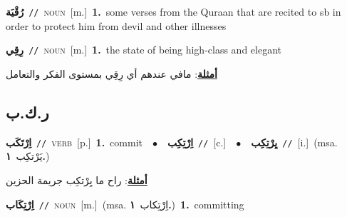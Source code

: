 \documentclass[10pt,a4paper,twoside]{article} %
\begin{document}
\begin{multicols}{2}
{\setlength\topsep{0pt}\textbf{\foreignlanguage{arabic}{رُقْيَة}}\ {\color{gray}\texttt{//}\color{black}}\ \textsc{noun}\ [m.]\ \textbf{1.}~some verses from the Quraan that are recited to sb in order to protect him from devil and other illnesses\ } \vspace{2mm}

{\setlength\topsep{0pt}\textbf{\foreignlanguage{arabic}{رِقِي}}\ {\color{gray}\texttt{//}\color{black}}\ \textsc{noun}\ [m.]\ \textbf{1.}~the state of being high-class and elegant\  \begin{flushright}\color{gray}\foreignlanguage{arabic}{\textbf{\underline{\foreignlanguage{arabic}{أمثلة}}}: مافي عندهم أي رِقِي بمستوى الفكر والتعامل}\end{flushright}\color{black}} \vspace{2mm}

\vspace{-3mm}
\subsection*{\color{blue}\foreignlanguage{arabic}{ر.ك.ب}\color{blue}{}} 

{\setlength\topsep{0pt}\textbf{\foreignlanguage{arabic}{اِرْتَكَب}}\ {\color{gray}\texttt{//}\color{black}}\ \textsc{verb}\ [p.]\ \textbf{1.}~commit\ \ $\bullet$\ \ \setlength\topsep{0pt}\textbf{\foreignlanguage{arabic}{اِرْتِكِب}}\ {\color{gray}\texttt{//}\color{black}}\ [c.]\ \ $\bullet$\ \ \setlength\topsep{0pt}\textbf{\foreignlanguage{arabic}{يِرْتِكِب}}\ {\color{gray}\texttt{//}\color{black}}\ [i.]\ \color{gray}(msa. \foreignlanguage{arabic}{يَرْتكِب}~\foreignlanguage{arabic}{\textbf{١.}})\color{black}\  \begin{flushright}\color{gray}\foreignlanguage{arabic}{\textbf{\underline{\foreignlanguage{arabic}{أمثلة}}}: راح ما يِرْتكِب جريمة الحزين}\end{flushright}\color{black}} \vspace{2mm}

{\setlength\topsep{0pt}\textbf{\foreignlanguage{arabic}{اِرْتِكَاب}}\ {\color{gray}\texttt{//}\color{black}}\ \textsc{noun}\ [m.]\ \color{gray}(msa. \foreignlanguage{arabic}{اِرْتِكاب}~\foreignlanguage{arabic}{\textbf{١.}})\color{black}\ \textbf{1.}~committing\ } \vspace{2mm}


\end{multicols}
\end{document}
